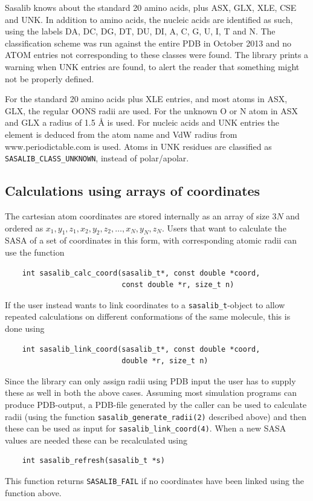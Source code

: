 \documentclass[a4paper,11pt]{article}
\begin{document}
Sasalib knows about the standard 20 amino acids, plus ASX, GLX, XLE,
CSE and UNK. In addition to amino acids, the nucleic acids are
identified as such, using the labels DA, DC, DG, DT, DU, DI, A, C, G,
U, I, T and N. The classification scheme was run against the entire
PDB in October 2013 and no ATOM entries not corresponding to these
classes were found. The library prints a warning when UNK entries are
found, to alert the reader that something might not be properly
defined.

For the standard 20 amino acids plus XLE entries, and most atoms in
ASX, GLX, the regular OONS radii are used. For the unknown O or N atom
in ASX and GLX a radius of 1.5 Å is used. For nucleic acids and UNK
entries the element is deduced from the atom name and VdW radius from
www.periodictable.com is used. Atoms in UNK residues are classified as
\verb|SASALIB_CLASS_UNKNOWN|, instead of polar/apolar.

\subsection{Calculations using arrays of coordinates}

The cartesian atom coordinates are stored internally as an array of
size $3N$ and ordered as $x_1,y_1,z_1,x_2,y_2,z_2, \ldots ,x_N,y_N,z_N$.
Users that want to calculate the SASA of a set of coordinates in this form,
with corresponding atomic radii can use the function
\begin{verbatim}
    int sasalib_calc_coord(sasalib_t*, const double *coord, 
                           const double *r, size_t n)
\end{verbatim}
If the user instead wants to link coordinates to a
\verb|sasalib_t|-object to allow repeated calculations on different
conformations of the same molecule, this is done using
\begin{verbatim}
    int sasalib_link_coord(sasalib_t*, const double *coord,
                           double *r, size_t n)
\end{verbatim}

Since the library can only assign radii using PDB input the user has
to supply these as well in both the above cases. Assuming most
simulation programs can produce PDB-output, a PDB-file generated by
the caller can be used to calculate radii (using the function
\verb|sasalib_generate_radii(2)| described above) and then these
can be used as input for \verb|sasalib_link_coord(4)|. When a new
SASA values are needed these can be recalculated using
\begin{verbatim} 
    int sasalib_refresh(sasalib_t *s)
\end{verbatim}
This function returns \verb|SASALIB_FAIL| if no coordinates have
been linked using the function above.
\end{document}
